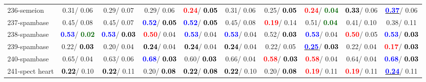 \begin{table}[h]
\begin{center}
{\begin{tabular}{lc|c|c|c|c|c|c|c|c}
236-semeion &   0.31/  0.06 &   0.29/  0.07 &   0.29/  0.06 & \textcolor{red}{\textbf{  0.24}}/\textcolor{black}{\textbf{  0.05}} &   0.31/  0.06 &   0.25/\textcolor{black}{\textbf{  0.05}} & \textcolor{red}{\textbf{  0.24}}/\textcolor{darkgreen}{\textbf{  0.04}} & \textcolor{black}{\textbf{  0.33}}/  0.06 & \underline{\textcolor{blue}{\textbf{  0.37}}}/  0.06 \\
237-spambase &   0.45/  0.08 &   0.45/  0.07 & \textcolor{blue}{\textbf{  0.52}}/\textcolor{black}{\textbf{  0.05}} & \textcolor{blue}{\textbf{  0.52}}/\textcolor{black}{\textbf{  0.05}} &   0.45/  0.08 & \textcolor{red}{\textbf{  0.19}}/  0.14 &   0.51/\textcolor{darkgreen}{\textbf{  0.04}} &   0.41/  0.10 &   0.38/  0.11 \\
238-spambase & \textcolor{blue}{\textbf{  0.53}}/\textcolor{darkgreen}{\textbf{  0.02}} & \textcolor{blue}{\textbf{  0.53}}/\textcolor{black}{\textbf{  0.03}} & \textcolor{red}{\textbf{  0.50}}/  0.04 & \textcolor{blue}{\textbf{  0.53}}/  0.04 & \textcolor{blue}{\textbf{  0.53}}/  0.04 &   0.52/\textcolor{black}{\textbf{  0.03}} & \textcolor{blue}{\textbf{  0.53}}/  0.04 & \textcolor{red}{\textbf{  0.50}}/  0.05 & \textcolor{blue}{\textbf{  0.53}}/\textcolor{black}{\textbf{  0.03}} \\ \hline
239-spambase &   0.22/\textcolor{black}{\textbf{  0.03}} &   0.20/  0.04 & \textcolor{black}{\textbf{  0.24}}/  0.04 & \textcolor{black}{\textbf{  0.24}}/  0.04 & \textcolor{black}{\textbf{  0.24}}/  0.04 &   0.22/  0.05 & \underline{\textcolor{blue}{\textbf{  0.25}}}/\textcolor{black}{\textbf{  0.03}} &   0.22/  0.04 & \textcolor{red}{\textbf{  0.17}}/\textcolor{black}{\textbf{  0.03}} \\
240-spambase &   0.65/  0.04 &   0.63/  0.06 & \textcolor{blue}{\textbf{  0.68}}/\textcolor{black}{\textbf{  0.03}} &   0.60/\textcolor{black}{\textbf{  0.03}} &   0.66/  0.04 & \textcolor{red}{\textbf{  0.58}}/\textcolor{black}{\textbf{  0.03}} & \textcolor{red}{\textbf{  0.58}}/  0.04 &   0.64/  0.04 & \textcolor{blue}{\textbf{  0.68}}/\textcolor{black}{\textbf{  0.03}} \\
241-spect heart & \textcolor{black}{\textbf{  0.22}}/  0.10 & \textcolor{black}{\textbf{  0.22}}/  0.11 &   0.20/\textcolor{black}{\textbf{  0.08}} & \textcolor{black}{\textbf{  0.22}}/\textcolor{black}{\textbf{  0.08}} & \textcolor{black}{\textbf{  0.22}}/  0.10 &   0.20/\textcolor{black}{\textbf{  0.08}} & \textcolor{red}{\textbf{  0.19}}/  0.11 & \textcolor{red}{\textbf{  0.19}}/  0.11 & \underline{\textcolor{blue}{\textbf{  0.24}}}/  0.11 \\

\end{tabular}}
\end{center}
\end{table}
